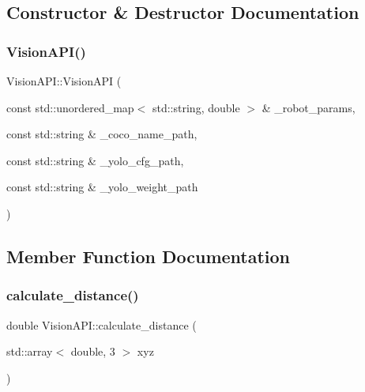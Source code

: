 \subsection{Constructor \& Destructor Documentation}
\mbox{\label{class_vision_a_p_i_afcf1ee4354678a29ef29852b8a2e13b5}} 
\subsubsection{\texorpdfstring{Vision\+A\+P\+I()}{VisionAPI()}}
{\footnotesize\ttfamily Vision\+A\+P\+I\+::\+Vision\+A\+PI (\begin{DoxyParamCaption}\item[{const std\+::unordered\+\_\+map$<$ std\+::string, double $>$ \&}]{\+\_\+robot\+\_\+params,  }\item[{const std\+::string \&}]{\+\_\+coco\+\_\+name\+\_\+path,  }\item[{const std\+::string \&}]{\+\_\+yolo\+\_\+cfg\+\_\+path,  }\item[{const std\+::string \&}]{\+\_\+yolo\+\_\+weight\+\_\+path }\end{DoxyParamCaption})\hspace{0.3cm}{\ttfamily [inline]}}



\subsection{Member Function Documentation}
\mbox{\label{class_vision_a_p_i_a86585c063f61f943222eee3290040572}} 
\subsubsection{\texorpdfstring{calculate\+\_\+distance()}{calculate\_distance()}}
{\footnotesize\ttfamily double Vision\+A\+P\+I\+::calculate\+\_\+distance (\begin{DoxyParamCaption}\item[{std\+::array$<$ double, 3 $>$}]{xyz }\end{DoxyParamCaption})}



